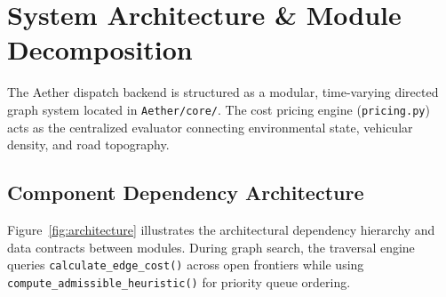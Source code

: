 \documentclass[10pt,a4paper]{article}
\begin{document}
\section{System Architecture \& Module Decomposition}

The Aether dispatch backend is structured as a modular, time-varying directed graph system located in \texttt{Aether/core/}. The cost pricing engine (\texttt{pricing.py}) acts as the centralized evaluator connecting environmental state, vehicular density, and road topography.

\subsection{Component Dependency Architecture}
Figure~\ref{fig:architecture} illustrates the architectural dependency hierarchy and data contracts between modules. During graph search, the traversal engine queries \texttt{calculate\_edge\_cost()} across open frontiers while using \texttt{compute\_admissible\_heuristic()} for priority queue ordering.
\end{document}
